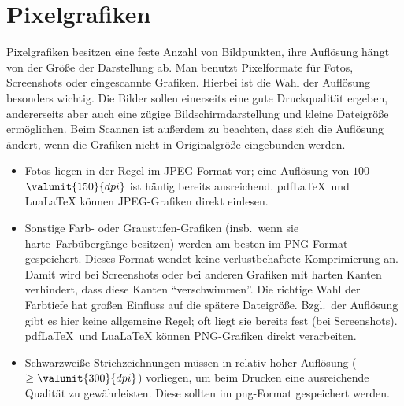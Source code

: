 \section{Pixelgrafiken}

Pixelgrafiken besitzen eine feste Anzahl von Bildpunkten, \dah ihre Auflösung hängt von der Größe der Darstellung ab.
Man benutzt Pixelformate \zB für Fotos, Screenshots oder eingescannte Grafiken.
Hierbei ist die Wahl der Auflösung besonders wichtig.
Die Bilder sollen einerseits eine gute Druckqualität ergeben, andererseits aber auch eine zügige Bildschirmdarstellung und kleine Dateigröße ermöglichen.
Beim Scannen ist außerdem zu beachten, dass sich die Auflösung ändert, wenn die Grafiken nicht in Originalgröße eingebunden werden.
\begin{itemize}
\item Fotos liegen in der Regel im JPEG-Format vor; eine Auflösung von $100$--$\valunit{150}{dpi}$ ist häufig bereits ausreichend.
  pdf\LaTeX\ und LuaLaTeX können JPEG-Grafiken direkt einlesen.
\item Sonstige Farb- oder Graustufen-Grafiken (insb.\ wenn sie \glqq harte\grqq\ Farbübergänge besitzen) werden am besten im PNG-Format gespeichert.
  Dieses Format wendet keine verlustbehaftete Komprimierung an.
  Damit wird bei Screenshots oder bei anderen Grafiken mit harten Kanten verhindert, dass diese Kanten "`verschwimmen"'.
  Die richtige Wahl der Farbtiefe hat großen Einfluss auf die spätere Dateigröße.
  Bzgl.\ der Auflösung gibt es hier keine allgemeine Regel; oft liegt sie bereits fest (\zB bei Screenshots).
  pdf\LaTeX\ und LuaLaTeX können PNG-Grafiken direkt verarbeiten.
\item Schwarzweiße Strichzeichnungen müssen in relativ hoher Auflösung ($\ge \valunit{300}{dpi}$) vorliegen, um beim Drucken eine ausreichende Qualität zu gewährleisten.
  Diese sollten im png-Format gespeichert werden.
\end{itemize}
